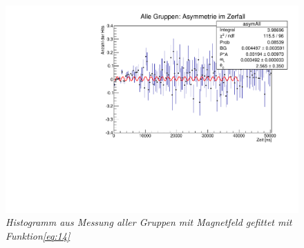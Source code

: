 \begin{figure}[h]
	\centering
	\includegraphics[width=120mm]{AlleGruppenAsymmetrie}
	\caption{ \itshape Histogramm aus Messung aller Gruppen mit Magnetfeld gefittet mit Funktion\ref{eq:14} }
	\label{fig:Abbildung 4}
\end{figure}
